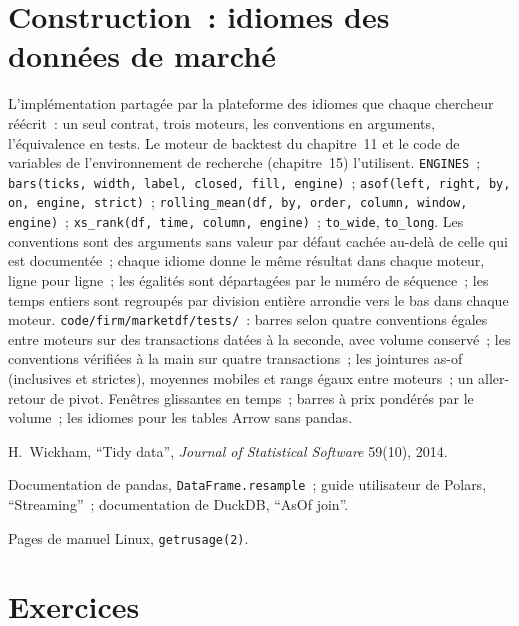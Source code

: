 \section{Construction~: idiomes des données de marché}\label{bld:pl:dataframes:marketdf}

\begin{build}
 L'implémentation partagée par la plateforme des idiomes que chaque chercheur réécrit~: un seul contrat, trois moteurs, les
conventions en arguments, l'équivalence en tests. Le moteur de backtest du chapitre~11 et le code de variables de l'environnement de recherche
(chapitre~15) l'utilisent.
 \texttt{ENGINES}~; \texttt{bars(ticks, width, label, closed, fill, engine)}~;
\texttt{asof(left, right, by, on, engine, strict)}~; \texttt{rolling\_mean(df, by, order, column, window, engine)}~; \texttt{xs\_rank(df, time, column, engine)}~;
\texttt{to\_wide}, \texttt{to\_long}.
 Les conventions sont des arguments sans valeur par défaut cachée au-delà de celle qui est documentée~; chaque idiome donne le même résultat dans
chaque moteur, ligne pour ligne~; les égalités sont départagées par le numéro de séquence~; les temps entiers sont regroupés par division entière arrondie vers le bas dans chaque moteur.
 \texttt{code/firm/marketdf/tests/}~: barres selon quatre conventions égales entre moteurs sur des transactions datées à la seconde,
avec volume conservé~; les conventions vérifiées à la main sur quatre transactions~; les jointures as-of (inclusives et strictes), moyennes mobiles et rangs égaux
entre moteurs~; un aller-retour de pivot.
 Fenêtres glissantes en temps~; barres à prix pondérés par le volume~; les idiomes pour les tables Arrow sans pandas.
\end{build}

\begin{omsources}
\item H.~Wickham, ``Tidy data'', \emph{Journal of Statistical Software} 59(10), 2014.
\item Documentation de pandas, \texttt{DataFrame.resample}~; guide utilisateur de Polars, ``Streaming''~; documentation de DuckDB, ``AsOf join''.
\item Pages de manuel Linux, \texttt{getrusage(2)}.
\end{omsources}

\section{Exercices}

